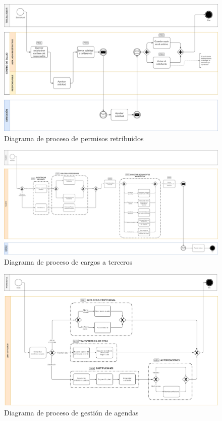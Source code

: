 \documentclass[12pt, a4paper, twoside, openright]{report}
\begin{document}
\begin{figure}
    \centering
    \begin{sideways}
        \includegraphics[width=0.95\textheight]{img/proceso-permisos.png}
    \end{sideways}
    \caption{Diagrama de proceso de permisos retribuidos}
    \label{fig:proceso-permisos}
\end{figure}

\begin{figure}
    \centering
    \begin{sideways}
        \includegraphics[width=0.95\textheight]{img/proceso-cargos.png}
    \end{sideways}
    \caption{Diagrama de proceso de cargos a terceros}
    \label{fig:proceso-cargos}
\end{figure}

\begin{figure}
    \centering
    \begin{sideways}
        \includegraphics[width=0.95\textheight]{img/proceso-agendas.png}
    \end{sideways}
    \caption{Diagrama de proceso de gestión de agendas}
    \label{fig:proceso-agendas}
\end{figure}

\printnoidxglossaries

\printbibliography
\end{document}
